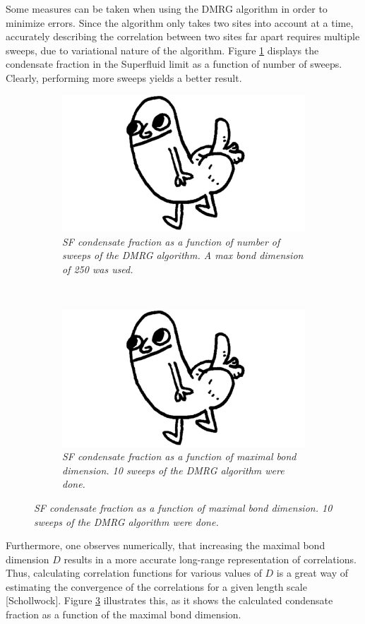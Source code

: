 Some measures can be taken when using the DMRG algorithm in order to minimize errors. Since the algorithm only takes two sites into account at a time, accurately describing the correlation between two sites far apart requires multiple sweeps, due to variational nature of the algorithm. Figure \ref{fig:sweepdependence} displays the condensate fraction in the Superfluid limit as a function of number of sweeps. Clearly, performing more sweeps yields a better result.
\begin{figure}[h!]
    \centering
    \begin{subfigure}[t]{0.49\textwidth}
        \includegraphics[width=\textwidth]{Figures/placeholder.jpg}
        \caption{\textit{SF condensate fraction as a function of number of sweeps of the DMRG algorithm. A max bond dimension of 250 was used.}}
        \label{fig:sweepdependence}
    \end{subfigure}
    ~
    \begin{subfigure}[t]{0.49\textwidth}
        \includegraphics[width=\textwidth]{Figures/placeholder.jpg}
        \caption{\textit{SF condensate fraction as a function of maximal bond dimension. 10 sweeps of the DMRG algorithm were done.}}
        \label{fig:bonddependence}
    \end{subfigure}    
\end{figure}
Furthermore, one observes numerically, that increasing the maximal bond dimension $D$ results in a more accurate long-range representation of correlations. Thus, calculating correlation functions for various values of $D$ is a great way of estimating the convergence of the correlations for a given length scale [Schollwock]. Figure \ref{fig:bonddependence} illustrates this, as it shows the calculated condensate fraction as a function of the maximal bond dimension.



